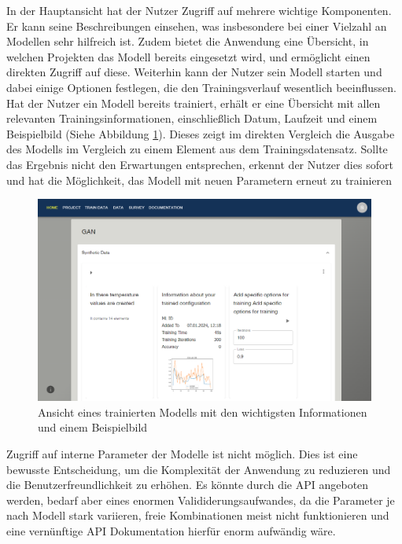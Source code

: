 In der Hauptansicht hat der Nutzer Zugriff auf mehrere wichtige Komponenten. Er kann seine Beschreibungen einsehen, was insbesondere bei einer Vielzahl an Modellen sehr hilfreich ist. 
Zudem bietet die Anwendung eine Übersicht, in welchen Projekten das Modell bereits eingesetzt wird, und ermöglicht einen direkten Zugriff auf diese. Weiterhin kann der Nutzer sein Modell starten und dabei einige Optionen festlegen, 
die den Trainingsverlauf wesentlich beeinflussen. Hat der Nutzer ein Modell bereits trainiert, erhält er eine Übersicht mit allen relevanten Trainingsinformationen, einschließlich Datum, Laufzeit und einem Beispielbild (Siehe Abbildung \ref{fig:ml_trained_configuration}). Dieses zeigt im direkten Vergleich die Ausgabe des Modells im Vergleich zu einem Element aus dem Trainingsdatensatz. Sollte das Ergebnis nicht den Erwartungen entsprechen, erkennt der Nutzer dies sofort und hat die Möglichkeit, das Modell mit neuen Parametern erneut zu trainieren
\begin{figure}[h]
    \centering
    \includegraphics[width=0.9\linewidth]{includes/figures/new_version/ml_configuration.png}
    \caption{Ansicht eines trainierten Modells mit den wichtigsten Informationen und einem Beispielbild}
\label{fig:ml_trained_configuration}
\end{figure}

Zugriff auf interne Parameter der Modelle ist nicht möglich. Dies ist eine bewusste Entscheidung, um die Komplexität der Anwendung zu reduzieren und die Benutzerfreundlichkeit zu erhöhen. Es könnte durch die API angeboten werden, 
bedarf aber eines enormen Valididerungsaufwandes, da die Parameter je nach Modell stark variieren, freie Kombinationen meist nicht funktionieren und eine vernünftige \ac{API} Dokumentation hierfür enorm aufwändig wäre.

